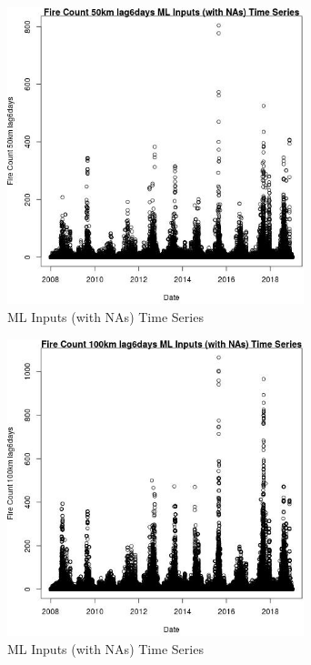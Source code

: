 \begin{figure} 
\centering  
\includegraphics[width=0.77\textwidth]{Code_Outputs/Report_ML_input_PM25_Step4_part_f_de_duplicated_aves_prioritize_24hr_obswNAs_Fire_Count_50km_lag6daysvDate.jpg} 
\caption{\label{fig:Report_ML_input_PM25_Step4_part_f_de_duplicated_aves_prioritize_24hr_obswNAsFire_Count_50km_lag6daysvDate}ML Inputs (with NAs) Time Series} 
\end{figure} 
 

\begin{figure} 
\centering  
\includegraphics[width=0.77\textwidth]{Code_Outputs/Report_ML_input_PM25_Step4_part_f_de_duplicated_aves_prioritize_24hr_obswNAs_Fire_Count_100km_lag6daysvDate.jpg} 
\caption{\label{fig:Report_ML_input_PM25_Step4_part_f_de_duplicated_aves_prioritize_24hr_obswNAsFire_Count_100km_lag6daysvDate}ML Inputs (with NAs) Time Series} 
\end{figure} 
 

